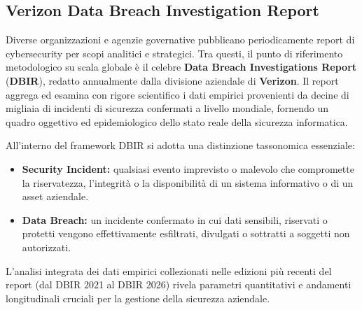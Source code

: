 \documentclass[../../main.tex]{subfiles}
\begin{document}
\subsection{Verizon Data Breach Investigation Report}
\label{subsec:verizon_dbir}

Diverse organizzazioni e agenzie governative pubblicano periodicamente report di cybersecurity per scopi analitici e strategici. Tra questi, il punto di riferimento metodologico su scala globale è il celebre \textbf{Data Breach Investigations Report} (\textbf{DBIR}), redatto annualmente dalla divisione aziendale di \textbf{Verizon}. Il report aggrega ed esamina con rigore scientifico i dati empirici provenienti da decine di migliaia di incidenti di sicurezza confermati a livello mondiale, fornendo un quadro oggettivo ed epidemiologico dello stato reale della sicurezza informatica.

All'interno del framework DBIR si adotta una distinzione tassonomica essenziale:
\begin{itemize}
    \item \textbf{Security Incident:} qualsiasi evento imprevisto o malevolo che compromette la riservatezza, l'integrità o la disponibilità di un sistema informativo o di un asset aziendale.
    \item \textbf{Data Breach:} un incidente confermato in cui dati sensibili, riservati o protetti vengono effettivamente esfiltrati, divulgati o sottratti a soggetti non autorizzati.
\end{itemize}

L'analisi integrata dei dati empirici collezionati nelle edizioni più recenti del report (dal DBIR 2021 al DBIR 2026) rivela parametri quantitativi e andamenti longitudinali cruciali per la gestione della sicurezza aziendale.
\end{document}
